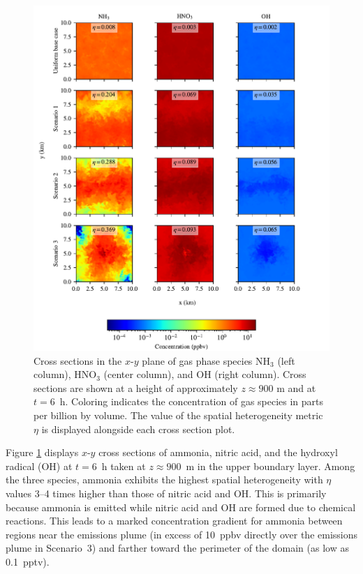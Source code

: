 \documentclass[journal abbreviation, manuscript]{copernicus}
\begin{document}
\begin{figure}[!h]
	\centering
	\includegraphics[]{figures/gas-spatial-heterogeneity-time36-z45.pdf}
	\caption{Cross sections in the $x$-$y$ plane of gas phase
          species NH$_3$ (left column), HNO$_3$ (center column), and
          OH (right column). Cross sections are shown at a height of
          approximately $z\approx900$ m and at $t=6$~h. Coloring
          indicates the concentration of gas species in parts per
          billion by volume. The value of the spatial heterogeneity
          metric $\eta$ is displayed alongside each cross section
          plot.}
	\label{fig:gas-cross-sec}
\end{figure} 

Figure \ref{fig:gas-cross-sec} displays $x$-$y$ cross sections of
ammonia, nitric acid, and the hydroxyl radical (OH) at $t=6$~h taken
at $z\approx900$~m in the upper boundary layer. Among the three
species, ammonia exhibits the highest spatial heterogeneity with
$\eta$ values 3--4 times higher than those of nitric acid and OH. This
is primarily because ammonia is emitted while nitric acid and OH are
formed due to chemical reactions. This leads to a marked concentration
gradient for ammonia between regions near the emissions plume (in
excess of 10~ppbv directly over the emissions plume in Scenario~3) and
farther toward the perimeter of the domain (as low as 0.1~pptv).
\end{document}
